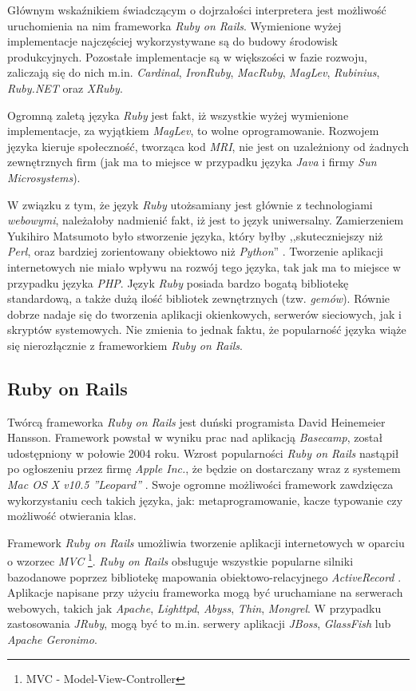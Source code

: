 \documentclass[a4paper,12pt]{article}
\begin{document}
Głównym wskaźnikiem świadczącym o dojrzałości interpretera jest
możliwość uruchomienia na nim frameworka \emph{Ruby on
  Rails}. Wymienione wyżej implementacje najczęściej wykorzystywane są
do budowy środowisk produkcyjnych. Pozostałe implementacje są w
większości w fazie rozwoju, zaliczają się do nich
m.in. \emph{Cardinal}, \emph{IronRuby}, \emph{MacRuby}, \emph{MagLev},
\emph{Rubinius}, \emph{Ruby.NET} oraz \emph{XRuby}.

Ogromną zaletą języka \emph{Ruby} jest fakt, iż wszystkie wyżej
wymienione implementacje, za wyjątkiem \emph{MagLev}, to wolne
oprogramowanie. Rozwojem języka kieruje społeczność, tworząca kod
\emph{MRI}, nie jest on uzależniony od żadnych zewnętrznych firm (jak
ma to miejsce w przypadku języka \emph{Java} i firmy \emph{Sun
  Microsystems}).

W związku z tym, że język \emph{Ruby} utożsamiany jest głównie z
technologiami \emph{webowymi}, należałoby nadmienić fakt, iż jest to
język uniwersalny. Zamierzeniem Yukihiro Matsumoto było stworzenie
języka, który byłby ,,skuteczniejszy niż \emph{Perl}, oraz bardziej
zorientowany obiektowo niż \emph{Python}''
\cite{matzinterview}. Tworzenie aplikacji internetowych nie miało
wpływu na rozwój tego języka, tak jak ma to miejsce w przypadku języka
\emph{PHP}. Język \emph{Ruby} posiada bardzo bogatą bibliotekę
standardową, a także dużą ilość bibliotek zewnętrznych
(tzw. \emph{gemów}). Równie dobrze nadaje się do tworzenia aplikacji
okienkowych, serwerów sieciowych, jak i skryptów systemowych. Nie
zmienia to jednak faktu, że popularność języka wiąże się nierozłącznie
z frameworkiem \emph{Ruby on Rails}.

\subsection{Ruby on Rails}
Twórcą frameworka \emph{Ruby on Rails} jest duński programista David
Heinemeier Hansson. Framework powstał w wyniku prac nad aplikacją
\emph{Basecamp}, został udostępniony w połowie 2004 roku. Wzrost
popularności \emph{Ruby on Rails} nastąpił po ogłoszeniu przez firmę
\emph{Apple Inc.}, że będzie on dostarczany wraz z systemem \emph{Mac
  OS X v10.5 ''Leopard''} \cite{rubyonrails}. Swoje ogromne możliwości
framework zawdzięcza wykorzystaniu cech takich języka, jak:
metaprogramowanie, kacze typowanie czy możliwość otwierania klas.

Framework \emph{Ruby on Rails} umożliwia tworzenie aplikacji
internetowych w oparciu o wzorzec \emph{MVC} \footnote{MVC -
  Model-View-Controller\cite{mvc}}. \emph{Ruby on Rails} obsługuje
wszystkie popularne silniki bazodanowe poprzez bibliotekę mapowania
obiektowo-relacyjnego \emph{ActiveRecord} \cite{orm}. Aplikacje
napisane przy użyciu frameworka mogą być uruchamiane na serwerach
webowych, takich jak \emph{Apache}, \emph{Lighttpd}, \emph{Abyss},
\emph{Thin}, \emph{Mongrel}. W przypadku zastosowania \emph{JRuby},
mogą być to m.in. serwery aplikacji \emph{JBoss}, \emph{GlassFish} lub
\emph{Apache Geronimo}.
\end{document}

